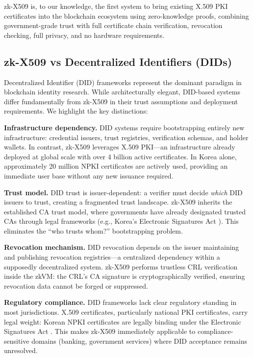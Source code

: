 \documentclass[11pt, a4paper]{article}
\begin{document}
zk-X509 is, to our knowledge, the first system to bring existing X.509
PKI certificates into the blockchain ecosystem using zero-knowledge
proofs, combining government-grade trust with full certificate chain
verification, revocation checking, full privacy, and no hardware
requirements.

\subsection{zk-X509 vs Decentralized Identifiers
(DIDs)}\label{zk-x509-vs-decentralized-identifiers-dids}

Decentralized Identifier (DID) frameworks \cite{ref13, ref33} represent the
dominant paradigm in blockchain identity research. While architecturally
elegant, DID-based systems differ fundamentally from zk-X509 in their
trust assumptions and deployment requirements. We highlight the key
distinctions:

\textbf{Infrastructure dependency.} DID systems require bootstrapping
entirely new infrastructure: credential issuers, trust registries,
verification schemas, and holder wallets. In contrast, zk-X509 leverages
X.509 PKI---an infrastructure already deployed at global scale with over
4 billion active certificates. In Korea alone, approximately 20 million
NPKI certificates are actively used, providing an immediate user base
without any new issuance required.

\textbf{Trust model.} DID trust is issuer-dependent: a verifier must
decide \emph{which} DID issuers to trust, creating a fragmented trust
landscape. zk-X509 inherits the established CA trust model, where
governments have already designated trusted CAs through legal frameworks
(e.g., Korea's Electronic Signatures Act \cite{ref27}). This eliminates the
``who trusts whom?'' bootstrapping problem.

\textbf{Revocation mechanism.} DID revocation depends on the issuer
maintaining and publishing revocation registries---a centralized
dependency within a supposedly decentralized system. zk-X509 performs
trustless CRL verification inside the zkVM: the CRL's CA signature is
cryptographically verified, ensuring revocation data cannot be forged or
suppressed.

\textbf{Regulatory compliance.} DID frameworks lack clear regulatory
standing in most jurisdictions. X.509 certificates, particularly
national PKI certificates, carry legal weight: Korean NPKI certificates
are legally binding under the Electronic Signatures Act \cite{ref27}. This
makes zk-X509 immediately applicable to compliance-sensitive domains
(banking, government services) where DID acceptance remains unresolved.
\end{document}
